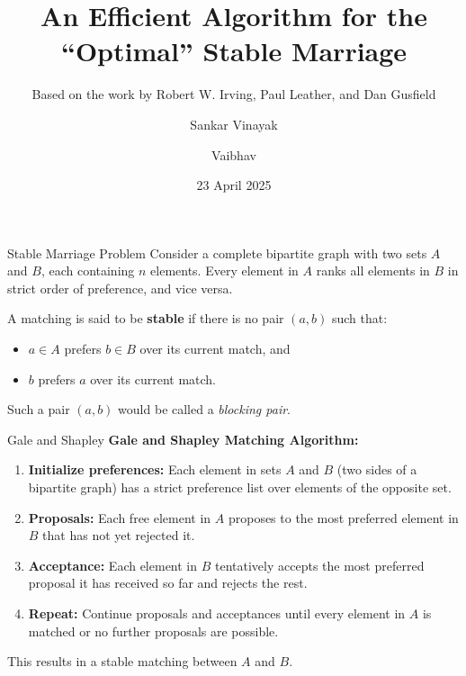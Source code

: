 \documentclass[aspectratio=169,xcolor=dvipsnames]{beamer}
\title[Optimal Stable Marriage]{An Efficient Algorithm for the ``Optimal'' Stable Marriage}
\subtitle{Based on the work by Robert W. Irving, Paul Leather, and Dan Gusfield}
\author[Sankar Vinayak, Vaibhav]{Sankar Vinayak \and Vaibhav}
\institute[CS&E, IIT Madras]{
  Department of Computer Science and Engineering \\
  Indian Institute of Technology Madras
}
\date{23 April 2025}
\begin{document}
\begin{frame}
    \titlepage
\end{frame}


    
\begin{frame}{Stable Marriage Problem}
    Consider a complete bipartite graph with two sets \( A \) and \( B \), each containing \( n \) elements. Every element in \( A \) ranks all elements in \( B \) in strict order of preference, and vice versa.

    A matching is said to be \textbf{stable} if there is no pair \( (a, b) \) such that:
    \begin{itemize}
        \item \( a \in A \) prefers \( b \in B \) over its current match, and
        \item \( b \) prefers \( a \) over its current match.
    \end{itemize}
    Such a pair \( (a, b) \) would be called a \textit{blocking pair}.
\end{frame}

\begin{frame}{Gale and Shapley}
  \textbf{Gale and Shapley Matching Algorithm:}
  \begin{enumerate}
    \item \textbf{Initialize preferences:} Each element in sets \( A \) and \( B \) (two sides of a bipartite graph) has a strict preference list over elements of the opposite set.
    \item \textbf{Proposals:} Each free element in \( A \) proposes to the most preferred element in \( B \) that has not yet rejected it.
    \item \textbf{Acceptance:} Each element in \( B \) tentatively accepts the most preferred proposal it has received so far and rejects the rest.
    \item \textbf{Repeat:} Continue proposals and acceptances until every element in \( A \) is matched or no further proposals are possible.
  \end{enumerate}
  
  This results in a stable matching between \( A \) and \( B \).
\end{frame}
\end{document}
